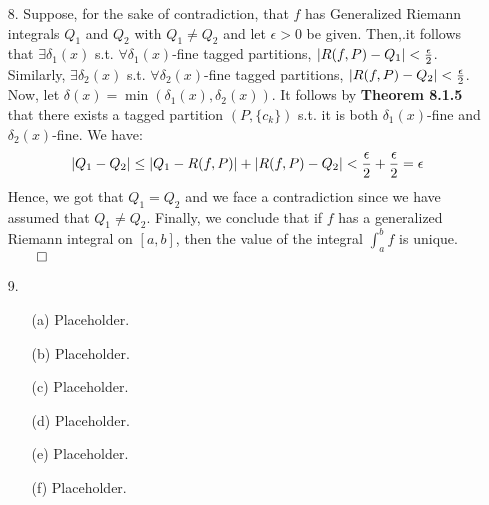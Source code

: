 \documentclass[11pt]{article}
\DeclarePairedDelimiter\abs{\lvert}{\rvert}%
\begin{document}
\begin{itemize}
    \item[8.]
        Suppose, for the sake of contradiction, that $f$ has Generalized
        Riemann integrals $Q_1$ and $Q_2$ with $Q_1 \neq Q_2$ and let $\epsilon
        > 0$ be given. Then,.it follows that $\exists \delta_1(x)$ s.t.
        $\forall \delta_1(x)$-fine tagged partitions, $\abs{R(f, P) - Q_1} <
        \frac{\epsilon}{2}$. Similarly, $\exists \delta_2(x)$ s.t. $\forall
        \delta_2(x)$-fine tagged partitions, $\abs{R(f, P) - Q_2} <
        \frac{\epsilon}{2}$. Now, let $\delta(x) = \min (\delta_1(x),
        \delta_2(x))$. It follows by \textbf{Theorem 8.1.5} that there exists a
        tagged partition $(P, \{c_k\})$ s.t. it is both $\delta_1(x)$-fine and
        $\delta_2(x)$-fine. We have:
        \begin{equation*}
            \abs{Q_1 - Q_2} \leq \abs{Q_1 - R(f, P)} + \abs{R(f, P) - Q_2}
                            < \frac{\epsilon}{2} + \frac{\epsilon}{2}
                            = \epsilon
        \end{equation*}
        Hence, we got that $Q_1 = Q_2$ and we face a contradiction since we
        have assumed that $Q_1 \neq Q_2$. Finally, we conclude that if $f$ has
        a generalized Riemann integral on $[a, b]$, then the value of the
        integral $\int_a^b f$ is unique.\\
        $\qed$

    \item[9.]
        \begin{itemize}
            \item[(a)]
                Placeholder.

            \item[(b)]
                Placeholder.

            \item[(c)]
                Placeholder.

            \item[(d)]
                Placeholder.

            \item[(e)]
                Placeholder.

            \item[(f)]
                Placeholder.
        \end{itemize}
\end{itemize}

\end{document}
